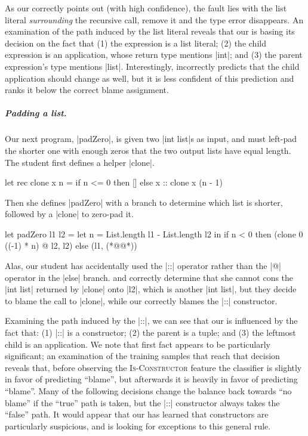 As our \dectree correctly points out (with high confidence), the fault
lies with the list literal \emph{surrounding} the recursive call, remove
it and the type error disappears.
%
An examination of the path induced by the list literal reveals that our
\dectree is basing its decision on the fact that
%
(1) the expression is a list literal;
%
(2) the child expression is an application, whose return type mentions |int|; and
%
(3) the parent expression's type mentions |list|.
%
Interestingly, \dectree incorrectly predicts that the child application
should change as well, but it is less confident of this prediction and
ranks it below the correct blame assignment.

\subparagraph{Padding a list.}
Our next program, |padZero|, is given two |int list|s as input, and must
left-pad the shorter one with enough zeros that the two output lists
have equal length.
%
The student first defines a helper |clone|.
%
\begin{ecode}
  let rec clone x n =
    if n <= 0 then
      []
    else
      x :: clone x (n - 1)
\end{ecode}
%
Then she defines |padZero| with a branch to determine which
list is shorter, followed by a |clone| to zero-pad it.
%
\lstset{firstnumber=last}
\begin{ecode}
  let padZero l1 l2 =
    let n = List.length l1 - List.length l2 in
    if n < 0 then
      (clone 0 ((-1) * n) @ l2, l2)
    else
      (l1, (*@@*))
\end{ecode}
\lstset{firstnumber=1}
%
Alas, our student has accidentally used the |::| operator rather than
the |@| operator in the |else| branch.
%
\sherrloc and \ocaml correctly determine that she cannot cons the
|int list| returned by |clone| onto |l2|, which is another |int list|,
but they decide to blame the call to |clone|, while our
\dectree correctly blames the |::| constructor.

Examining the path induced by the |::|, we can see that our
\dectree is influenced by the fact that:
%
(1) |::| is a constructor; %
%
(2) the parent is a tuple; and
%
(3) the leftmost child is an application.
%
We note that first fact appears to be particularly significant; an
examination of the training samples that reach that decision
reveals that, before observing the \textsc{Is-Constructor} feature the
classifier is slightly in favor of predicting ``blame'', but afterwards
it is heavily in favor of predicting ``blame''.
%
Many of the following decisions change the balance back towards ``no
blame'' if the ``true'' path is taken, but the |::| constructor always
takes the ``false'' path.
%
It would appear that our \dectree has learned that constructors are
particularly suspicious, and is looking for exceptions to this general
rule.
%

